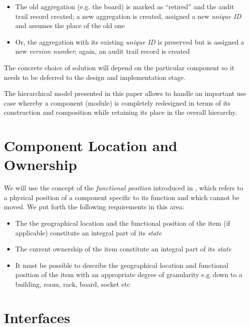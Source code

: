 \documentclass[pdftex,12pt,letter]{article}
\begin{document}
\begin{itemize}

\item The old aggregation (e.g. the board) is marked as ``retired'' and the audit trail record created; a new aggregation is
created, assigned a new \textit{unique ID} and assumes the place of the old one

\item Or, the aggregation with its existing \textit{unique ID} is preserved but is assigned a new \textit{version number};
again, an audit trail record is created

\end{itemize}

\noindent The concrete choice of solution will depend on the particular component so it needs to be deferred to the
design and implementation stage.

The hierarchical model presented in this paper allows to handle an important use case whereby a component (module)
is completely redesigned in terms of its construction and composition while retaining its place in the overall hierarchy.

\section{Component Location and Ownership}

We will use the concept of the \textit{functional position} introduced in \cite{atlasequipmentdb}, which refers
to a physical position of a component specific to its function and which cannot be moved. We put forth the
following requirements in this area:
\begin{itemize}

\item The  the geographical location and the functional position of the item (if applicable) constitute an integral part of its \textit{state}

\item The current ownership of the item constitute an integral part of its \textit{state}

\item It must be possible to describe the geographical location and functional position of the item with an appropriate
degree of granularity e.g.\,down to a building, room, rack, board, socket etc

\end{itemize}


\section{Interfaces}
\end{document}
